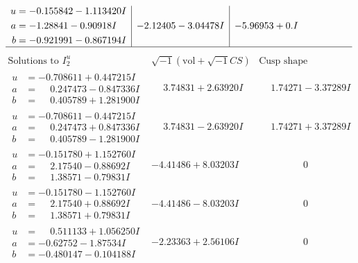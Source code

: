 \documentclass[1p]{elsarticle_modified}
\theoremstyle{definition}
\newcommand{\I}{\sqrt{-1}}
\begin{document}
$$\begin{array}{c|c|c}
\begin{aligned}
u &= -0.155842 - 1.113420 I \\
a &= -1.28841 - 0.90918 I \\
b &= -0.921991 - 0.867194 I\end{aligned}
 & -2.12405 - 3.04478 I & -5.96953 + 0. I\phantom{ +0.000000I}\\
 \hline 
 \end{array}$$\newpage$$\begin{array}{c|c|c}  
\text{Solutions to }I^u_{2}& \I (\text{vol} + \sqrt{-1}CS) & \text{Cusp shape}\\
 \hline 
\begin{aligned}
u &= -0.708611 + 0.447215 I \\
a &= \phantom{-}0.247473 - 0.847336 I \\
b &= \phantom{-}0.405789 + 1.281900 I\end{aligned}
 & \phantom{-}3.74831 + 2.63920 I & \phantom{-}1.74271 - 3.37289 I \\ \hline\begin{aligned}
u &= -0.708611 - 0.447215 I \\
a &= \phantom{-}0.247473 + 0.847336 I \\
b &= \phantom{-}0.405789 - 1.281900 I\end{aligned}
 & \phantom{-}3.74831 - 2.63920 I & \phantom{-}1.74271 + 3.37289 I \\ \hline\begin{aligned}
u &= -0.151780 + 1.152760 I \\
a &= \phantom{-}2.17540 - 0.88692 I \\
b &= \phantom{-}1.38571 - 0.79831 I\end{aligned}
 & -4.41486 + 8.03203 I & \phantom{-0.000000 } 0 \\ \hline\begin{aligned}
u &= -0.151780 - 1.152760 I \\
a &= \phantom{-}2.17540 + 0.88692 I \\
b &= \phantom{-}1.38571 + 0.79831 I\end{aligned}
 & -4.41486 - 8.03203 I & \phantom{-0.000000 } 0 \\ \hline\begin{aligned}
u &= \phantom{-}0.511133 + 1.056250 I \\
a &= -0.62752 - 1.87534 I \\
b &= -0.480147 - 0.104188 I\end{aligned}
 & -2.23363 + 2.56106 I & \phantom{-0.000000 } 0 \\ \hline\begin{aligned}

\end{aligned}
\end{array}$$
\end{document}
